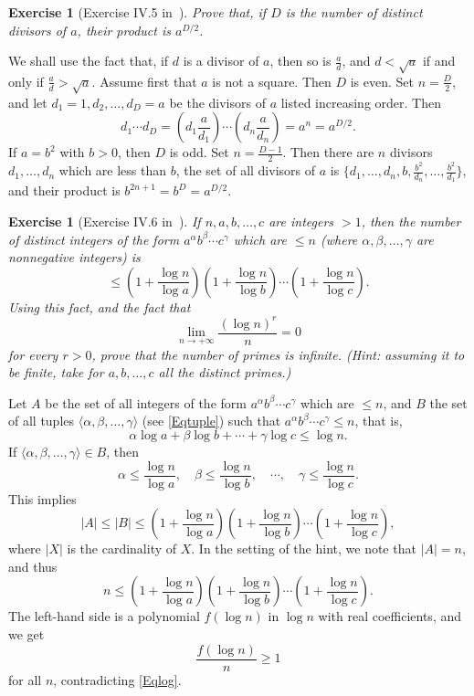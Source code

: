\documentclass[12pt,letterpaper]{article}
\newtheorem{exer}[thm]{Exercise}
\theoremstyle{definition}
\begin{document}
\begin{exer}[Exercise IV.5 in~\cite{weil1979}]
Prove that, if $D$ is the number of distinct divisors of $a$, their product is $a^{D/2}$.
\end{exer} 

We shall use the fact that, if $d$ is a divisor of $a$, then so is $\frac{a}{d}$, and $d<\sqrt{a}$ if and only if $\frac{a}{d} > \sqrt{a}$. Assume first that $a$ is not a square. Then $D$ is even. Set $n=\frac{D}{2}$, and let $d_1=1, d_2, \ldots, d_D=a$ be the divisors of $a$ listed increasing order. Then 
$$
d_1\cdots d_D = \left(d_1\frac{a}{d_1}\right)\cdots \left(d_n\frac{a}{d_n}\right)=a^n=a^{D/2}.
$$ 
If $a=b^2$ with $b>0$, then $D$ is odd. Set $n=\frac{D-1}{2}$. Then there are $n$ divisors $d_1,\ldots,d_n$ which are less than $b$, the set of all divisors of $a$ is $\{d_1, \ldots, d_n, b, \frac{b^2}{d_n}, \ldots, \frac{b^2}{d_1}\}$, and their product is $b^{2n+1}=b^D=a^{D/2}$. 

\begin{exer}[Exercise IV.6 in~\cite{weil1979}]
If $n,a,b,\ldots,c$ are integers $>1$, then the number of distinct integers of the form $a^{\alpha}b^{\beta}\cdots c^{\gamma}$ which are $\leq n$ (where $\alpha,\beta,\ldots,\gamma$ are nonnegative integers) is
\[
\leq \left(1+\frac{\log n}{\log a}\right)\left(1+\frac{\log n}{\log b}\right)\cdots\left(1+\frac{\log n}{\log c}\right).
\]
Using this fact, and the fact that 
\begin{equation}\label{Eqlog}
\lim_{n\to+\infty}\frac{(\log n)^r}{n}=0
\end{equation} 
for every $r>0$, prove that the number of primes is infinite. (Hint: assuming it to be finite, take for $a,b,\ldots,c$ all the distinct primes.) 
\end{exer} 

Let $A$ be the set of all integers of the form $a^{\alpha}b^{\beta}\cdots c^{\gamma}$ which are $\leq n$, and $B$ the set of all tuples $\langle\alpha,\beta,\ldots,\gamma\rangle$ (see \eqref{Eqtuple}) such that $a^{\alpha}b^{\beta}\cdots c^{\gamma}\leq n$, that is, 
$$
\alpha\log a+\beta\log b+\cdots+\gamma\log c\le\log n.
$$ 
If $\langle\alpha,\beta,\ldots,\gamma\rangle\in B$, then 
$$
\alpha\le\frac{\log n}{\log a},\quad\beta\le\frac{\log n}{\log b},\quad\cdots,\quad\gamma\le\frac{\log n}{\log c}.
$$ 
This implies 
$$
|A|\le|B|\le\left(1+\frac{\log n}{\log a}\right)\left(1+\frac{\log n}{\log b}\right)\cdots\left(1+\frac{\log n}{\log c}\right),
$$ 
where $|X|$ is the cardinality of $X$. In the setting of the hint, we note that $|A|=n$, and thus 
\[
n\leq\left(1+\frac{\log n}{\log a}\right)\left(1+\frac{\log n}{\log b}\right)\cdots\left(1+\frac{\log n}{\log c}\right).
\] 
The left-hand side is a polynomial $f(\log n)$ in $\log n$ with real coefficients, and we get 
$$
\frac{f(\log n)}{n}\ge1
$$ 
for all $n$, contradicting \eqref{Eqlog}. 
\end{document}
